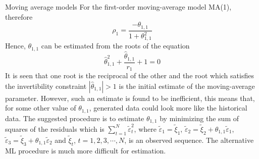 \documentclass[8pt]{beamer}
\renewcommand{\emph}[1]{\textcolor{myorange}{#1}}
\begin{document}
\begin{frame}{Moving average models}
    For the \emph{first-order moving-average model MA(1)}, therefore
    \begin{equation}
        \rho_1 = \frac{-\theta_{1,1}}{1+\theta_{1,1}^2}
        \label{e425}
        \end{equation}
        Hence, $\theta_{1,1}$ can be estimated from the roots of the equation
    \begin{equation}
        \hat{\theta}_{1,1}^2 + \frac{\hat{\theta}_{1,1}}{r_1} + 1 = 0
        \label{e426}
        \end{equation}
        It is seen that one root is the reciprocal of the other and the root which satisfies the \emph{invertibility} constraint $|\hat{\theta}_{1,1}|>1$ is the initial estimate of the \emph{moving-average parameter}. However, such an estimate is found to be inefficient, this means that, for some other value of $\theta_{1,1}$, generated data could look more like the historical data. The suggested procedure is to estimate $\theta_{1,1}$ by minimizing the sum of squares of the residuals which is $\sum_{t=1}^N \tilde{\varepsilon}_t^2$, where $\tilde{\varepsilon}_1 = \tilde{\xi}_1$, $\tilde{\varepsilon}_2 = \tilde{\xi}_2 + \theta_{1,1}\tilde{\varepsilon}_1$, $\tilde{\varepsilon}_3 = \tilde{\xi}_3+ \theta_{1,1} \tilde{\varepsilon}_2$ and $\tilde{\xi}_t$, $t=1,2,3,\cdots, N$, is an observed sequence. The alternative ML procedure is much more difficult for estimation. 
\end{frame}

\end{document}
